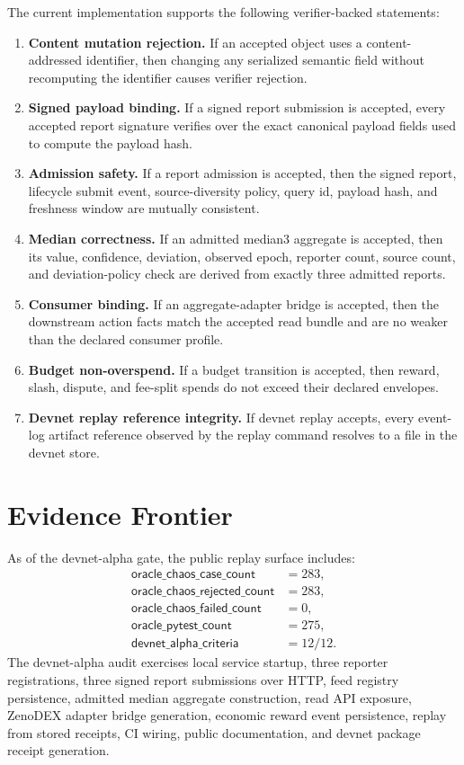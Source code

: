 \documentclass[11pt]{article}
\begin{document}
The current implementation supports the following verifier-backed statements:

\begin{enumerate}[leftmargin=*]
  \item \textbf{Content mutation rejection.} If an accepted object uses a
  content-addressed identifier, then changing any serialized semantic field
  without recomputing the identifier causes verifier rejection.
  \item \textbf{Signed payload binding.} If a signed report submission is
  accepted, every accepted report signature verifies over the exact canonical
  payload fields used to compute the payload hash.
  \item \textbf{Admission safety.} If a report admission is accepted, then the
  signed report, lifecycle submit event, source-diversity policy, query id,
  payload hash, and freshness window are mutually consistent.
  \item \textbf{Median correctness.} If an admitted median3 aggregate is
  accepted, then its value, confidence, deviation, observed epoch, reporter
  count, source count, and deviation-policy check are derived from exactly
  three admitted reports.
  \item \textbf{Consumer binding.} If an aggregate-adapter bridge is accepted,
  then the downstream action facts match the accepted read bundle and are no
  weaker than the declared consumer profile.
  \item \textbf{Budget non-overspend.} If a budget transition is accepted, then
  reward, slash, dispute, and fee-split spends do not exceed their declared
  envelopes.
  \item \textbf{Devnet replay reference integrity.} If devnet replay accepts,
  every event-log artifact reference observed by the replay command resolves
  to a file in the devnet store.
\end{enumerate}

\section{Evidence Frontier}

As of the devnet-alpha gate, the public replay surface includes:
\[
\begin{array}{rl}
\mathsf{oracle\_chaos\_case\_count} &= 283,\\
\mathsf{oracle\_chaos\_rejected\_count} &= 283,\\
\mathsf{oracle\_chaos\_failed\_count} &= 0,\\
\mathsf{oracle\_pytest\_count} &= 275,\\
\mathsf{devnet\_alpha\_criteria} &= 12/12.
\end{array}
\]
The devnet-alpha audit exercises local service startup, three reporter
registrations, three signed report submissions over HTTP, feed registry
persistence, admitted median aggregate construction, read API exposure,
ZenoDEX adapter bridge generation, economic reward event persistence, replay
from stored receipts, CI wiring, public documentation, and devnet package
receipt generation.
\end{document}
